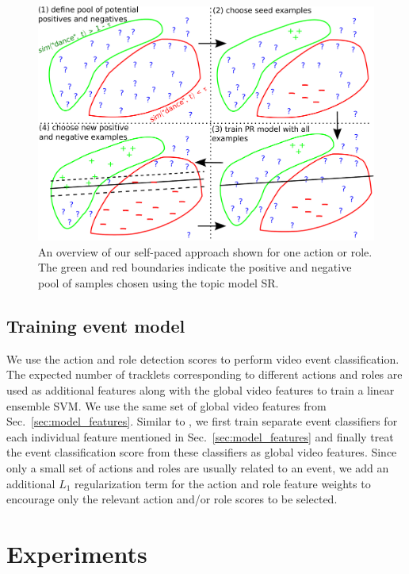 \documentclass[10pt,twocolumn,letterpaper]{article}
\begin{document}
\begin{figure}
  \includegraphics[scale = 0.27]{../images/system2b.pdf}
  \caption{An overview of our self-paced approach shown for one action or role. 
  The green and red boundaries indicate the positive and negative pool of samples chosen using the topic model SR.}
\label{fig:system2}
\end{figure}

\vspace*{-4pt}

\subsection{Training event model}\label{sec:event_model}
We use the action and role detection scores to perform video event
classification. The expected number of tracklets corresponding to different
actions and roles are used as additional features along with the global video
features to train a linear ensemble SVM. We use the same set of global video
features from Sec.~\ref{sec:model_features}. Similar to \cite{Izadinia_ECCV12},
we first train separate event classifiers for each individual feature mentioned
in Sec.~\ref{sec:model_features} and finally treat the event classification
score from these classifiers as global video features. Since only a small set
of actions and roles are usually related to an event, we add an additional
$L_1$ regularization term for the action and role feature weights to encourage
only the relevant action and/or role scores to be selected.

\section{Experiments}
\end{document}
